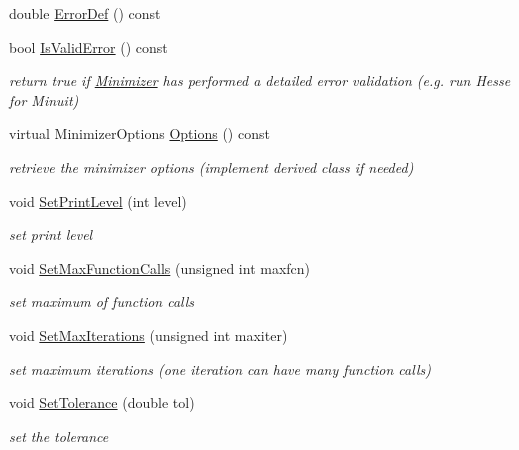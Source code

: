\begin{DoxyCompactItemize}
double \mbox{\hyperlink{classROOT_1_1Math_1_1Minimizer_aa4e46f31bb8dfb770fcb704e585a3593}{Error\+Def}} () const
\item 
bool \mbox{\hyperlink{classROOT_1_1Math_1_1Minimizer_aac4dfcda9c3eb7e672d450c0e78c61bf}{Is\+Valid\+Error}} () const
\begin{DoxyCompactList}\small\item\em return true if \mbox{\hyperlink{classROOT_1_1Math_1_1Minimizer}{Minimizer}} has performed a detailed error validation (e.\+g. run Hesse for Minuit) \end{DoxyCompactList}\item 
virtual Minimizer\+Options \mbox{\hyperlink{classROOT_1_1Math_1_1Minimizer_a9b0653bcf3d2c0b4df79c1db2068ff27}{Options}} () const
\begin{DoxyCompactList}\small\item\em retrieve the minimizer options (implement derived class if needed) \end{DoxyCompactList}\item 
void \mbox{\hyperlink{classROOT_1_1Math_1_1Minimizer_a726ee3c159360784a2d76f0b9e9594a6}{Set\+Print\+Level}} (int level)
\begin{DoxyCompactList}\small\item\em set print level \end{DoxyCompactList}\item 
void \mbox{\hyperlink{classROOT_1_1Math_1_1Minimizer_aabbadaa76bb5723fcaec0eb7d40850b2}{Set\+Max\+Function\+Calls}} (unsigned int maxfcn)
\begin{DoxyCompactList}\small\item\em set maximum of function calls \end{DoxyCompactList}\item 
void \mbox{\hyperlink{classROOT_1_1Math_1_1Minimizer_a1aa272e578cdf2af1b80cc641ce6c58c}{Set\+Max\+Iterations}} (unsigned int maxiter)
\begin{DoxyCompactList}\small\item\em set maximum iterations (one iteration can have many function calls) \end{DoxyCompactList}\item 
void \mbox{\hyperlink{classROOT_1_1Math_1_1Minimizer_a5b7ee47a24b2412801654b8cde2c9b4f}{Set\+Tolerance}} (double tol)
\begin{DoxyCompactList}\small\item\em set the tolerance \end{DoxyCompactList}\item 

\end{DoxyCompactItemize}
